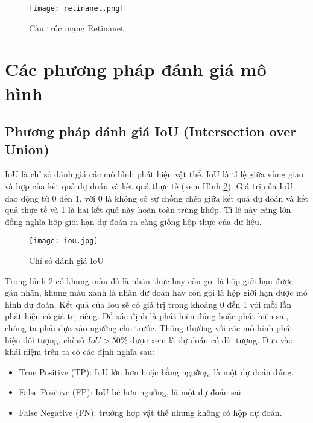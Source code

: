 \documentclass[../the.tex]{subfiles}
\begin{document}
\begin{figure}[H]
	\centering
	\texttt{[image: retinanet.png]}
	\caption{Cấu trúc mạng Retinanet \cite{lin2018focal}}
	\label{fig:retinanet}
\end{figure}

\section{Các phương pháp đánh giá mô hình}

\subsection{Phương pháp đánh giá IoU (Intersection over Union)}

{\fontsize{13}{12} \selectfont

	IoU là chỉ số đánh giá các mô hình phát hiện vật thể. IoU là tỉ lệ giữa vùng giao và hợp của kết quả dự đoán và kết quả thực tế (xem Hình \ref{fig:iou}).
	Giá trị của IoU dao động
	từ 0 đến 1, với 0 là không có sự chồng chéo giữa kết quả dự đoán và kết quả
	thực tế và 1 là hai kết quả này hoàn toàn trùng khớp.
	Tỉ lệ này càng lớn đồng nghĩa hộp giới hạn dự đoán ra càng giống hộp thực của dữ liệu.

}

\begin{figure}[H]
	\centering
	\texttt{[image: iou.jpg]}
	\caption{Chỉ số đánh giá IoU}
	\label{fig:iou}
\end{figure}

{\fontsize{13}{12} \selectfont

Trong hình \ref{fig:iou} có khung màu đỏ là nhãn thực hay còn gọi là hộp giới hạn
được gán nhãn, khung màu xanh là nhãn dự đoán hay còn gọi là hộp giới hạn được mô hình dự đoán.
Kết quả của Iou sẽ có giá trị trong khoảng 0 đến 1 với mỗi lần phát hiện có giá trị riêng. Để xác định là phát hiện đúng hoặc phát hiện sai, chúng ta phải dựa vào ngưỡng cho trước.
Thông thường với các mô hình phát hiện đôi tượng, chỉ số $IoU > 50\%$ được xem là dự đoán có đối tượng. Dựa vào khái niệm trên ta có các định nghĩa sau:

\begin{itemize}
	\item True Positive (TP): IoU lớn hơn hoặc bằng ngưỡng, là một dự đoán đúng.
	\item False Positive (FP): IoU bé hơn ngưỡng, là một dự đoán sai.
	\item False Negative (FN): trường hợp vật thể nhưng không có hộp dự đoán.
\end{itemize}

}
\end{document}
